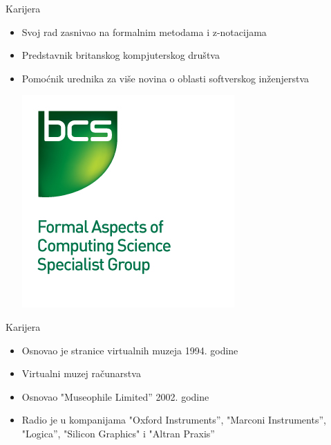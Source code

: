 \documentclass{beamer}
\begin{document}
\begin{frame}{Karijera}

    \begin{itemize}

        \item Svoj rad zasnivao na formalnim metodama i z-notacijama

        \item Predstavnik britanskog kompjuterskog društva

        \item Pomoćnik urednika za više novina o oblasti softverskog inženjerstva

	\begin{left} \includegraphics[scale=2]{BCS-FACS_logo.jpg} \end{left}

    \end{itemize}

\end{frame}



\begin{frame}{Karijera}

\begin{itemize}

		\item Osnovao je stranice virtualnih muzeja 1994. godine

		\item Virtualni muzej računarstva 

		\item Osnovao "Museophile Limited” 2002. godine

		\item  Radio je u kompanijama "Oxford Instruments”, "Marconi Instruments”, "Logica”, "Silicon Graphics" i "Altran Praxis”

		    \end{itemize}

\end{frame}
\end{document}
